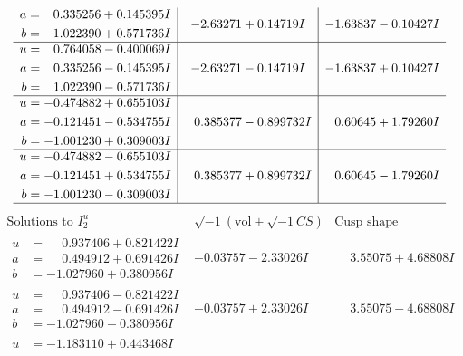 \documentclass[1p]{elsarticle_modified}
\theoremstyle{definition}
\newcommand{\I}{\sqrt{-1}}
\begin{document}
$$\begin{array}{c|c|c}
\begin{aligned}
a &= \phantom{-}0.335256 + 0.145395 I \\
b &= \phantom{-}1.022390 + 0.571736 I\end{aligned}
 & -2.63271 + 0.14719 I & -1.63837 - 0.10427 I \\ \hline\begin{aligned}
u &= \phantom{-}0.764058 - 0.400069 I \\
a &= \phantom{-}0.335256 - 0.145395 I \\
b &= \phantom{-}1.022390 - 0.571736 I\end{aligned}
 & -2.63271 - 0.14719 I & -1.63837 + 0.10427 I \\ \hline\begin{aligned}
u &= -0.474882 + 0.655103 I \\
a &= -0.121451 - 0.534755 I \\
b &= -1.001230 + 0.309003 I\end{aligned}
 & \phantom{-}0.385377 - 0.899732 I & \phantom{-}0.60645 + 1.79260 I \\ \hline\begin{aligned}
u &= -0.474882 - 0.655103 I \\
a &= -0.121451 + 0.534755 I \\
b &= -1.001230 - 0.309003 I\end{aligned}
 & \phantom{-}0.385377 + 0.899732 I & \phantom{-}0.60645 - 1.79260 I\\
 \hline 
 \end{array}$$\newpage$$\begin{array}{c|c|c}  
\text{Solutions to }I^u_{2}& \I (\text{vol} + \sqrt{-1}CS) & \text{Cusp shape}\\
 \hline 
\begin{aligned}
u &= \phantom{-}0.937406 + 0.821422 I \\
a &= \phantom{-}0.494912 + 0.691426 I \\
b &= -1.027960 + 0.380956 I\end{aligned}
 & -0.03757 - 2.33026 I & \phantom{-}3.55075 + 4.68808 I \\ \hline\begin{aligned}
u &= \phantom{-}0.937406 - 0.821422 I \\
a &= \phantom{-}0.494912 - 0.691426 I \\
b &= -1.027960 - 0.380956 I\end{aligned}
 & -0.03757 + 2.33026 I & \phantom{-}3.55075 - 4.68808 I \\ \hline\begin{aligned}
u &= -1.183110 + 0.443468 I \\

\end{aligned}
\end{array}$$
\end{document}
